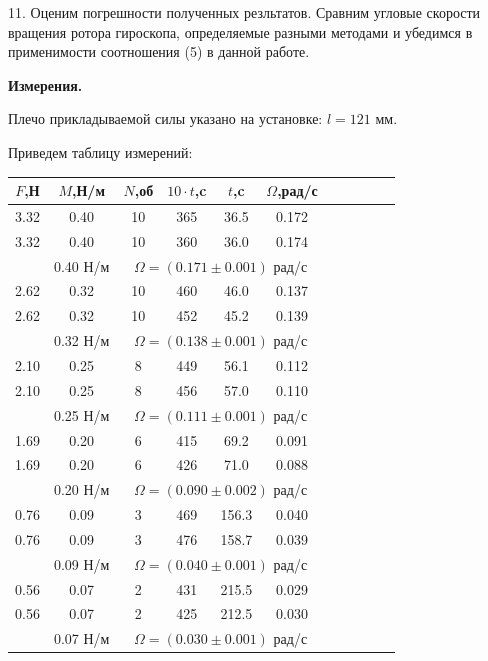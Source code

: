 \documentclass[14pt]{article}
\begin{document}
11. Оценим погрешности полученных резльтатов. Сравним угловые скорости вращения ротора гироскопа, определяемые разными методами и убедимся в применимости соотношения (5) в данной работе.

\vspace{1cm}
\textbf{Измерения.}
\vspace{1cm}


Плечо прикладываемой силы указано на установке: $l = 121$ мм.

Приведем таблицу измерений:

\begin{center}
\begin{tabular}{|c|c|c|c|c|c|c|c|c|c|c|}
\hline
$F$,Н	&	$M$,Н/м		&	$N$,об	&	$10\cdot t$,c	&	$t$,c	&	$\Omega$,рад/с			\\
\hline
3.32	&	0.40		&	10		&	365				&	36.5	&	0.172					\\
\hline
3.32	&	0.40		&	10		&	360				&	36.0	&	0.174					\\
\hline
		&	0.40 Н/м	&		\multicolumn{4}{|c|}{$\Omega = (0.171 \pm 0.001)$ рад/с}		\\

\hline
2.62	&	0.32		&	10		&	460				&	46.0	&	0.137					\\
\hline
2.62	&	0.32		&	10		&	452				&	45.2	&	0.139					\\
\hline
		&	0.32 Н/м	&		\multicolumn{4}{|c|}{$\Omega = (0.138 \pm 0.001)$ рад/с}		\\
		
\hline
2.10	&	0.25		&	8		&	449				&	56.1	&	0.112					\\
\hline
2.10	&	0.25		&	8		&	456				&	57.0	&	0.110					\\
\hline
		&	0.25 Н/м	&		\multicolumn{4}{|c|}{$\Omega = (0.111 \pm 0.001)$ рад/с}		\\
		
\hline
1.69	&	0.20		&	6		&	415				&	69.2	&	0.091					\\
\hline
1.69	&	0.20		&	6		&	426				&	71.0	&	0.088					\\
\hline
		&	0.20 Н/м	&		\multicolumn{4}{|c|}{$\Omega = (0.090 \pm 0.002)$ рад/с}		\\
		
\hline
0.76	&	0.09		&	3		&	469				&	156.3	&	0.040					\\
\hline
0.76	&	0.09		&	3		&	476				&	158.7	&	0.039					\\
\hline
		&	0.09 Н/м	&		\multicolumn{4}{|c|}{$\Omega = (0.040 \pm 0.001)$ рад/с}		\\
		
\hline
0.56	&	0.07		&	2		&	431				&	215.5	&	0.029					\\
\hline
0.56	&	0.07		&	2		&	425				&	212.5	&	0.030					\\
\hline
		&	0.07 Н/м	&		\multicolumn{4}{|c|}{$\Omega = (0.030 \pm 0.001)$ рад/с}		\\
		
\hline
\end{tabular}
\end{center}
\end{document}
